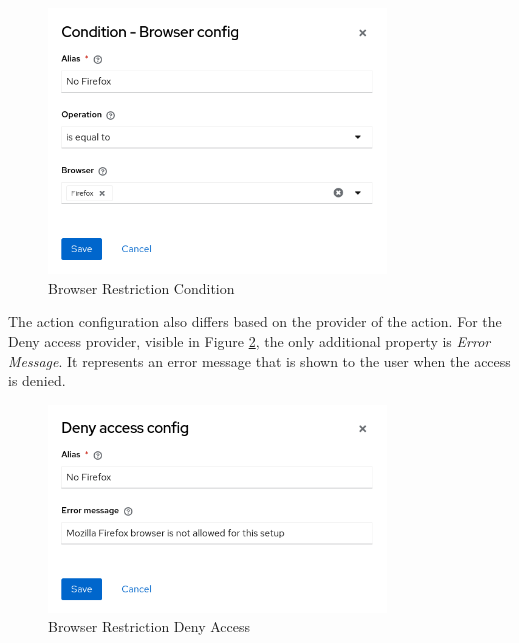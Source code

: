 \begin{figure}[htbp]
  \centering
  \includegraphics[width=0.8\textwidth]{img/sections/5-design/policy-browser-condition.png}
  \caption{Browser Restriction Condition}
  \label{fig:design-policy-browser-flow-condition}
\end{figure}

The action configuration also differs based on the provider of the action.
For the Deny access provider, visible in Figure \ref{fig:design-policy-browser-flow-deny}, the only additional property is \textit{Error Message}.
It represents an error message that is shown to the user when the access is denied.

\newpage

\begin{figure}[htbp]
  \centering
  \includegraphics[width=0.8\textwidth]{img/sections/5-design/policy-browser-deny.png}
  \caption{Browser Restriction Deny Access}
  \label{fig:design-policy-browser-flow-deny}
\end{figure}

\newpage
